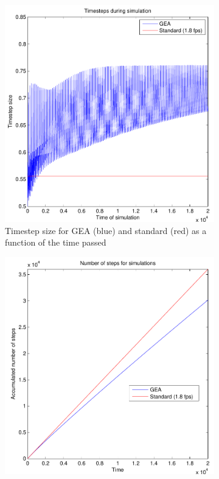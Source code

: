 \documentclass[11pt]{article}
\begin{document}
\begin{figure}
    \begin{subfigure}[t]{0.5\textwidth}
        \includegraphics[width=\textwidth]{../images/inverse_multiscale_steps.pdf}
        \caption{Timestep size for GEA (blue) and standard (red) as a function
        of the time passed}
        \label{fig:inverse_multiscale_steps}
    \end{subfigure}
    \begin{subfigure}[t]{0.5\textwidth}
        \includegraphics[width=\textwidth]{../images/inverse_multiscale_cumstep.pdf}

\end{subfigure}
\end{figure}
\end{document}
